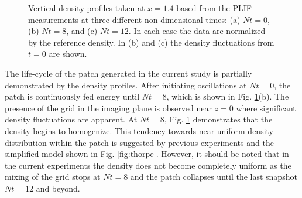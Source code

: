 \documentclass{piv13-abstract}
\newcommand{\figLabel}{Fig. }
\begin{document}
\begin{figure}[ht]
\centering
{}
\caption{Vertical density profiles taken at $x=1.4$ based from the PLIF measurements at three different non-dimensional times: (a) $Nt=0$, (b) $Nt=8$, and (c) $Nt = 12$. In each case the data are normalized by the reference density. In (b) and (c) the density fluctuations from $t=0$ are shown. \label{fig:rho_profile}}
\end{figure}

The life-cycle of the patch generated in the current study is partially demonstrated by the density profiles. After initiating oscillations at $Nt=0$, the patch is continuously fed energy until $Nt=8$, which is shown in \figLabel\ref{fig:rho_profile}(b). The presence of the grid in the imaging plane is observed near $z=0$ where significant density fluctuations are apparent. At $Nt=8$, \figLabel\ref{fig:rho_profile} demonstrates that the density begins to homogenize. This tendency towards near-uniform density distribution within the patch is suggested by previous experiments \cite{Silva1992,Silva1998} and the simplified model shown in \figLabel\ref{fig:thorpe}. However, it should be noted that in the current experiments the density does not become completely uniform as the mixing of the grid stops at $Nt=8$ and the patch collapses until the last snapshot $Nt=12$ and beyond.
\end{document}
